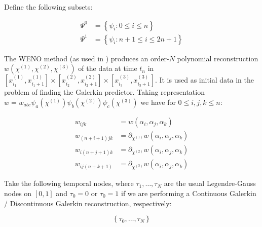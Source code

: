 \documentclass[twoside,english,final,5p,times,twocolumn]{elsarticle}
\begin{document}
Define the following subsets:

\begin{subequations}

\begin{align}
\Psi^{0} & =\left\{ \psi_{i}:0\leq i\leq n\right\} \\
\Psi^{1} & =\left\{ \psi_{i}:n+1\leq i\leq2n+1\right\} 
\end{align}

\end{subequations}

The WENO method (as used in \citet{Dumbser2013}) produces an order-$N$
polynomial reconstruction $w\left(\chi^{\left(1\right)},\chi^{\left(2\right)},\chi^{\left(3\right)}\right)$
of the data at time $t_{n}$ in $\left[x_{i_{1}}^{\left(1\right)},x_{i_{1}+1}^{\left(1\right)}\right]\times\left[x_{i_{2}}^{\left(2\right)},x_{i_{2}+1}^{\left(2\right)}\right]\times\left[x_{i_{3}}^{\left(3\right)},x_{i_{3}+1}^{\left(3\right)}\right]$.
It is used as initial data in the problem of finding the Galerkin
predictor. Taking representation $w=w_{abc}\psi_{a}\left(\chi^{\left(1\right)}\right)\psi_{b}\left(\chi^{\left(2\right)}\right)\psi_{c}\left(\chi^{\left(3\right)}\right)$
we have for $0\leq i,j,k\leq n$:

\begin{subequations}

\begin{align}
w_{ijk} & =w\left(\alpha_{i},\alpha_{j},\alpha_{k}\right)\\
w_{\left(n+i+1\right)jk} & =\partial_{\chi^{\left(1\right)}}w\left(\alpha_{i},\alpha_{j},\alpha_{k}\right)\\
w_{i\left(n+j+1\right)k} & =\partial_{\chi^{\left(2\right)}}w\left(\alpha_{i},\alpha_{j},\alpha_{k}\right)\\
w_{ij\left(n+k+1\right)} & =\partial_{\chi^{\left(3\right)}}w\left(\alpha_{i},\alpha_{j},\alpha_{k}\right)
\end{align}

\end{subequations}

Take the following temporal nodes, where $\tau_{1},\ldots,\tau_{N}$
are the usual Legendre-Gauss nodes on $\left[0,1\right]$ and $\tau_{0}=0$
or $\tau_{0}=1$ if we are performing a Continuous Galerkin / Discontinuous
Galerkin reconstruction, respectively:

\begin{equation}
\left\{ \tau_{0},\dots,\tau_{N}\right\} 
\end{equation}
\end{document}
